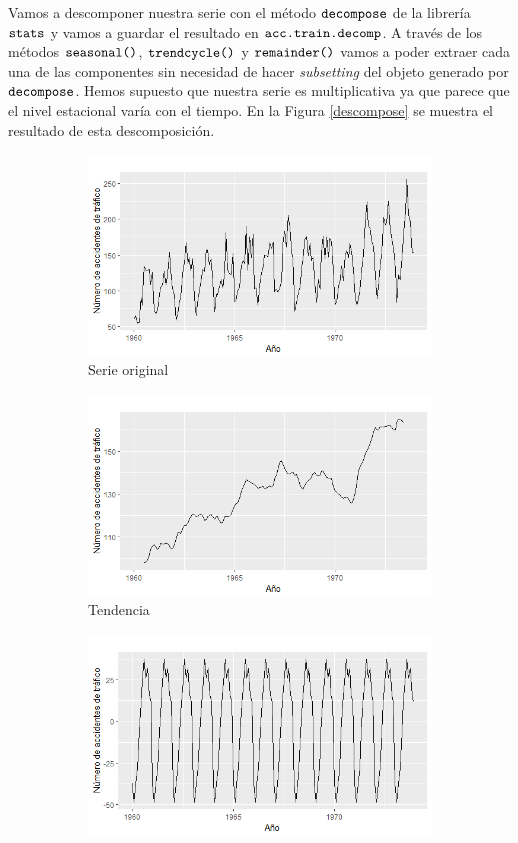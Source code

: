 Vamos a descomponer nuestra serie con el método $\verb!decompose!$ de la librería $\verb!stats!$ y vamos a guardar el resultado en $\verb!acc.train.decomp!$. A través de los métodos $\verb!seasonal()!$, $\verb!trendcycle()!$ y $\verb!remainder()!$ vamos a poder extraer cada una de las componentes sin necesidad de hacer \textit{subsetting} del objeto generado por $\verb!decompose!$. Hemos supuesto que nuestra serie es multiplicativa ya que parece que el nivel estacional varía con el tiempo. En la Figura \ref{descompose} se muestra el resultado de esta descomposición.
\begin{figure} [t]
\begin{subfigure}{.5\textwidth}
  \centering
  \includegraphics[width=.8\linewidth]{Images/Modelizacion/33-serie.png}
  \caption{Serie original}
  \label{fig:sfig1}
\end{subfigure}
\begin{subfigure}{.5\textwidth}
  \centering
  \includegraphics[width=.8\linewidth]{Images/Modelizacion/33-tend.png}
  \caption{Tendencia}
  \label{fig:sfig2}
\end{subfigure}
\begin{subfigure}{.5\textwidth}
  \centering
  \includegraphics[width=.8\linewidth]{Images/Modelizacion/33-season.png}

\end{subfigure}
\end{figure}
